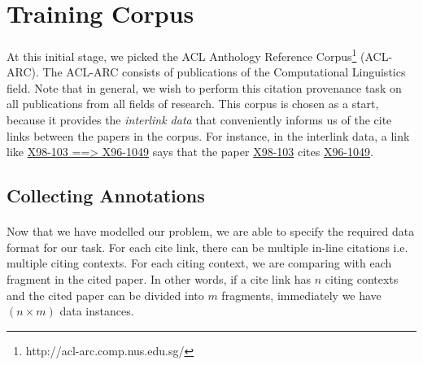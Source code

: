\section{Training Corpus}
\paragraph{}
At this initial stage, we picked the ACL Anthology Reference Corpus\footnote{http://acl-arc.comp.nus.edu.sg/} (ACL-ARC). The ACL-ARC consists of publications of the Computational Linguistics field. Note that in general, we wish to perform this citation provenance task on all publications from all fields of research. This corpus is chosen as a start, because it provides the \textit{interlink data} that conveniently informs us of the cite links between the papers in the corpus. For instance, in the interlink data, a link like \url{X98-103 ==> X96-1049} says that the paper \url{X98-103} cites \url{X96-1049}.

\subsection{Collecting Annotations}
\paragraph{}
Now that we have modelled our problem, we are able to specify the required data format for our task. For each cite link, there can be multiple in-line citations i.e. multiple citing contexts. For each citing context, we are comparing with each fragment in the cited paper. In other words, if a cite link has $n$ citing contexts and the cited paper can be divided into $m$ fragments, immediately we have $(n \times m)$ data instances.

